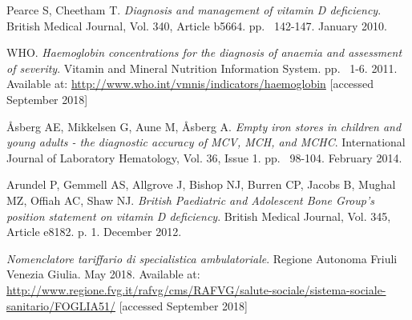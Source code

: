\begin{thebibliography}{50}
  Pearce S, Cheetham T.
  \textit{Diagnosis and management of vitamin D deficiency}.
  British Medical Journal, Vol. 340, Article b5664.
  pp. ~142-147.
  January 2010.
  
  WHO.
  \textit{Haemoglobin concentrations for the diagnosis of anaemia and assessment of severity}.
  Vitamin and Mineral Nutrition Information System.
  pp. ~1-6.
  2011.
  Available at: \url{http://www.who.int/vmnis/indicators/haemoglobin} [accessed September 2018]
  
  Åsberg AE, Mikkelsen G, Aune M, Åsberg A.
  \textit{Empty iron stores in children and young adults - the diagnostic accuracy of MCV, MCH, and MCHC}.
  International Journal of Laboratory Hematology, Vol. 36, Issue 1.
  pp. ~98-104.
  February 2014.
  
  Arundel P, Gemmell AS, Allgrove J, Bishop NJ, Burren CP, Jacobs B, Mughal MZ, Offiah AC, Shaw NJ.
  \textit{British Paediatric and Adolescent Bone Group’s position statement on vitamin D deficiency}.
  British Medical Journal, Vol. 345, Article e8182.
  p. 1.
  December 2012.
  
  \textit{Nomenclatore tariffario di specialistica ambulatoriale}.
  Regione Autonoma Friuli Venezia Giulia.
  May 2018.
  Available at: \url{http://www.regione.fvg.it/rafvg/cms/RAFVG/salute-sociale/sistema-sociale-sanitario/FOGLIA51/} [accessed September 2018]

\end{thebibliography}